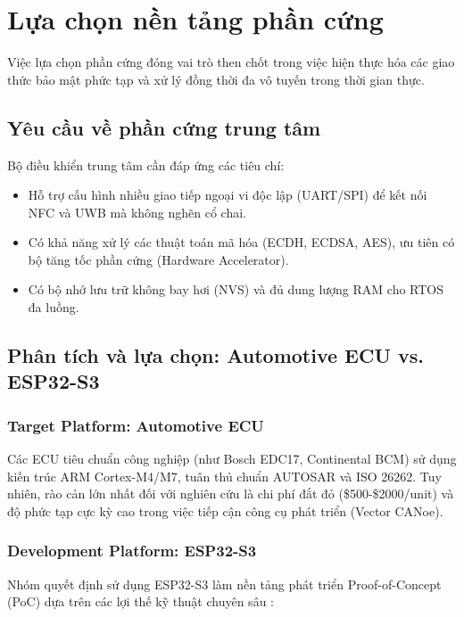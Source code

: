 






\section{Lựa chọn nền tảng phần cứng}

Việc lựa chọn phần cứng đóng vai trò then chốt trong việc hiện thực hóa các giao thức bảo mật phức tạp và xử lý đồng thời đa vô tuyến trong thời gian thực.

\subsection{Yêu cầu về phần cứng trung tâm}
Bộ điều khiển trung tâm cần đáp ứng các tiêu chí:
\begin{itemize}
    \item Hỗ trợ cấu hình nhiều giao tiếp ngoại vi độc lập (UART/SPI) để kết nối NFC và UWB mà không nghẽn cổ chai.
    \item Có khả năng xử lý các thuật toán mã hóa (ECDH, ECDSA, AES), ưu tiên có bộ tăng tốc phần cứng (Hardware Accelerator).
    \item Có bộ nhớ lưu trữ không bay hơi (NVS) và đủ dung lượng RAM cho RTOS đa luồng.
\end{itemize}

\subsection{Phân tích và lựa chọn: Automotive ECU vs. ESP32-S3}

\subsubsection{Target Platform: Automotive ECU}
Các ECU tiêu chuẩn công nghiệp (như Bosch EDC17, Continental BCM) sử dụng kiến trúc ARM Cortex-M4/M7, tuân thủ chuẩn AUTOSAR và ISO 26262. Tuy nhiên, rào cản lớn nhất đối với nghiên cứu là chi phí đắt đỏ (\$500-\$2000/unit) và độ phức tạp cực kỳ cao trong việc tiếp cận công cụ phát triển (Vector CANoe).

\subsubsection{Development Platform: ESP32-S3}
Nhóm quyết định sử dụng ESP32-S3 làm nền tảng phát triển Proof-of-Concept (PoC) dựa trên các lợi thế kỹ thuật chuyên sâu \cite{esp32s3}:

